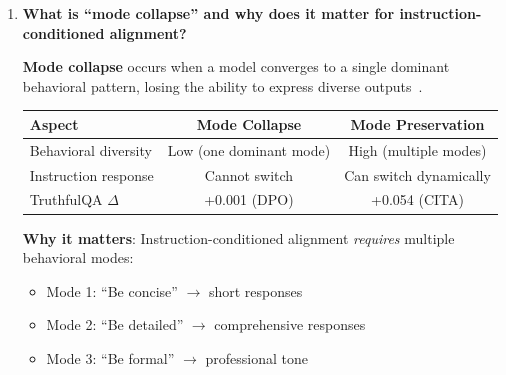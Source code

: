 \begin{enumerate}[label=\textbf{Q\arabic*.}, leftmargin=*, itemsep=8pt]
\begin{enumerate}[leftmargin=*,itemsep=2pt]
    \item \textbf{AI agent orchestration}: Agents dynamically adjust alignment based on task context:
    \begin{verbatim}
    Code review: "Be precise and critical"
    User support: "Be empathetic and helpful"
    \end{verbatim}

    \item \textbf{Regulatory compliance}: Different jurisdictions require different content policies. CITA enables runtime policy switching without model swaps.
\end{enumerate}

\textbf{Cost savings}: Maintaining N policy-specific DPO models costs N$\times$ compute/storage. One CITA model with N instruction templates costs 1$\times$.

\vspace{4mm}

\item \textbf{What is ``mode collapse'' and why does it matter for instruction-conditioned alignment?}

 \textbf{Mode collapse} occurs when a model converges to a single dominant behavioral pattern, losing the ability to express diverse outputs~\cite{liu2024kl}.

\begin{table}[H]
\centering
\small
\begin{tabular}{@{}lcc@{}}
\toprule
\textbf{Aspect} & \textbf{Mode Collapse} & \textbf{Mode Preservation} \\
\midrule
Behavioral diversity & Low (one dominant mode) & High (multiple modes) \\
\hline
Instruction response & Cannot switch & Can switch dynamically \\
\hline
TruthfulQA $\Delta$ & +0.001 (DPO) & +0.054 (CITA) \\
\bottomrule
\end{tabular}
\end{table}

\textbf{Why it matters}: Instruction-conditioned alignment \textit{requires} multiple behavioral modes:
\begin{itemize}[leftmargin=*,itemsep=1pt]
    \item Mode 1: ``Be concise'' $\rightarrow$ short responses
    \item Mode 2: ``Be detailed'' $\rightarrow$ comprehensive responses
    \item Mode 3: ``Be formal'' $\rightarrow$ professional tone
\end{itemize}


\end{enumerate}
